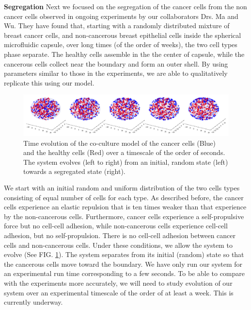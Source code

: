 \documentclass[aps,prb,twocolumn,groupedaddress,nofootinbib,floatfix]{revtex4}
\begin{document}
{\bf  Segregation}
Next we focused on the segregation of the cancer cells from the non cancer cells
observed in ongoing experiments by our collaborators Drs. Ma and Wu. 
They have found that, starting with a randomly distributed mixture of breast cancer cells,
and non-cancerous breast epithelial cells inside the spherical microfluidic capsule, over long times
(of the order of weeks), the two cell types phase separate. The healthy cells assemble in the the center of capsule,
while the cancerous cells collect near the boundary and form an outer shell. By using parameters similar to those 
in the experiments, we are able to qualitatively replicate this using our model.
\begin{figure}[t]
  \includegraphics[width=\textwidth]{separation.png}
  \caption[separation]
    {Time evolution of the co-culture model of the cancer cells (Blue) and the healthy cells (Red) over a timescale of the order of seconds. The system evolves (left to right) from an initial, random state (left) towards a segregated state (right).}
   \label{fig:separation}
\end{figure}

We start with an initial random and uniform distribution of the two cells types consisting of  
equal number of cells for each type. As described before, the cancer cells experience an elastic
repulsion that is ten times weaker than that experience by the non-cancerous cells. Furthermore, 
cancer cells experience a self-propulsive force but no cell-cell adhesion, while non-cancerous cells
experience cell-cell adhesion, but no self-propulsion. There is no cell-cell adhesion between cancer cells
and non-cancerous cells.  Under these conditions, we allow the system to evolve (See
FIG. \ref{fig:separation}). The system separates from its initial (random) state
so that the cancerous cells move toward the boundary. We have only run our system for an experimental run time
corresponding to a few seconds. To be able to compare with the experiments more accurately, we will need to study evolution
of our system over an experimental timescale of the order of at least a week. This is currently underway. 
\end{document}
